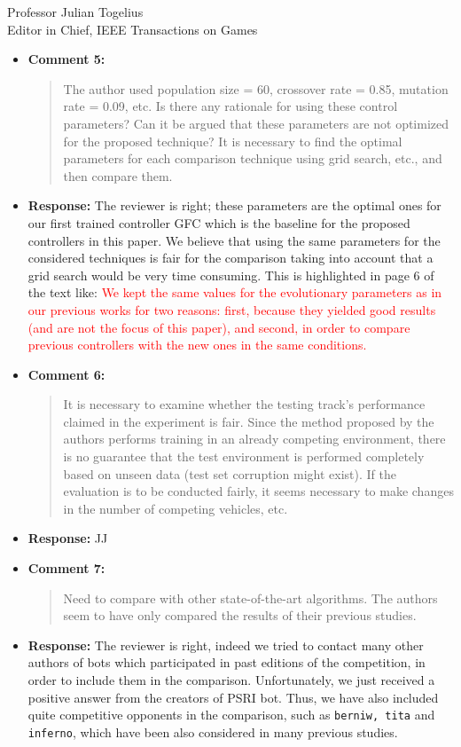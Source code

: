 \documentclass[10pt]{letter} %
\begin{document}
\begin{letter}{Professor Julian Togelius \\ Editor in Chief, IEEE Transactions on Games}
\begin{enumerate}
\begin{itemize}
		\item {\bf Comment 5:}
		\begin{quote}
The author used population size = 60, crossover rate = 0.85, mutation rate = 0.09, etc. Is there any rationale for using these control parameters? Can it be argued that these parameters are not optimized for the proposed technique? It is necessary to find the optimal parameters for each comparison technique using grid search, etc., and then compare them.
			\end{quote}	
		\item {\bf Response:} 
		The reviewer is right; these parameters are the optimal ones for our first trained controller GFC which is the baseline for the proposed controllers in this paper. We believe that using the same parameters for the considered techniques is fair for the comparison taking into account that a grid search would be very time consuming. 
		This is highlighted in page 6 of the text like:
		\textcolor{red}{
		We kept the same values for the evolutionary parameters as in our previous works for two reasons: first, because they yielded good results (and are not the focus of
		this paper), and second, in order to compare previous controllers with
		the new ones in the same conditions.}
		
		\item {\bf Comment 6:}
		\begin{quote}
It is necessary to examine whether the testing track's performance claimed in the experiment is fair. Since the method proposed by the authors performs training in an already competing environment, there is no guarantee that the test environment is performed completely based on unseen data (test set corruption might exist). If the evaluation is to be conducted fairly, it seems necessary to make changes in the number of competing vehicles, etc.
			\end{quote}	
		\item {\bf Response:} 
		JJ
		\item {\bf Comment 7:}
		\begin{quote}
Need to compare with other state-of-the-art algorithms. The authors seem to have only compared the results of their previous studies.				
			\end{quote}	
		\item {\bf Response:} 
		The reviewer is right, indeed we tried to contact many other authors of bots which participated in past editions of the competition, in order to include them in the comparison. Unfortunately, we just received a positive answer from the creators of PSRI bot. Thus, we have also included quite competitive opponents in the comparison, such as \texttt{berniw, tita} and \texttt{inferno}, which have been also considered in many previous studies.


\end{itemize}
\end{enumerate}
\end{letter}
\end{document}
